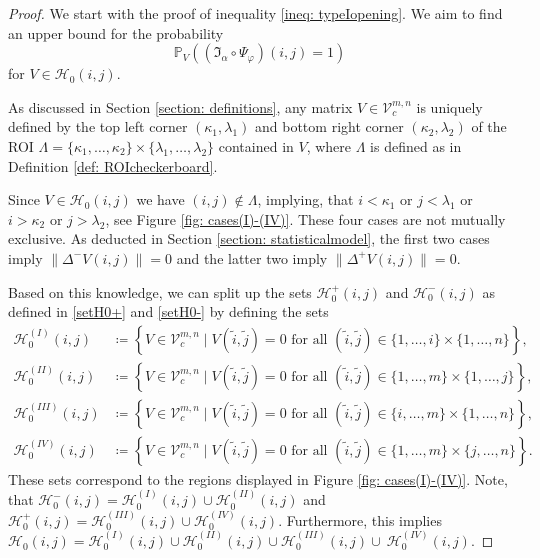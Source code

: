 \documentclass[a4paper,12pt]{article}
\newcommand{\norm}[1]{\lVert#1\rVert}
\theoremstyle{plain}
\theoremstyle{definition}
\numberwithin{equation}{section}
\begin{document}
\begin{proof}
	We start with the proof of inequality \eqref{ineq: typeIopening}. We aim to find an upper bound for the probability
	\begin{equation*}
		\mathbb{P}_V\left( (\mathfrak{I}_\alpha \circ \Psi_\varphi)(i, j) = 1 \right)
	\end{equation*}
	for $V \in \mathcal{H}_0(i, j)$.
	
	As discussed in Section \ref{section: definitions}, any matrix $V \in \mathcal{V}_c^{m, n}$ is uniquely defined by the top left corner $(\kappa_1, \lambda_1)$ and bottom right corner $(\kappa_2, \lambda_2)$ of the ROI $\varLambda = \{ \kappa_1, \dots, \kappa_2 \} \times \{ \lambda_1, \dots, \lambda_2 \}$ contained in $V$, where $\varLambda$ is defined as in Definition \ref{def: ROIcheckerboard}.
	
	Since $V \in \mathcal{H}_0(i, j)$ we have $(i, j) \notin \varLambda$, implying, that $i < \kappa_1$ or $j < \lambda_1$ or $i > \kappa_2$ or $j > \lambda_2$, see Figure \ref{fig: cases(I)-(IV)}. These four cases are not mutually exclusive. As deducted in Section \ref{section: statisticalmodel}, the first two cases imply $\norm{\Delta^- V(i, j)} = 0$ and the latter two imply $\norm{\Delta^+ V(i, j)} = 0$.
	
	Based on this knowledge, we can split up the sets $\mathcal{H}_0^+(i, j)$ and $\mathcal{H}_0^-(i, j)$ as defined in \eqref{setH0+} and \eqref{setH0-} by defining the sets
	\begin{align*}
		\mathcal{H}_0^{(I)}(i, j) &\coloneqq \left\{ V \in \mathcal{V}_c^{m, n} \mid V(\tilde{i}, \tilde{j}) = 0 \textrm{ for all } (\tilde{i}, \tilde{j}) \in \{ 1, \dots, i \} \times \{ 1, \dots, n \} \right\}, \\
		\mathcal{H}_0^{(II)}(i, j) &\coloneqq \left\{ V \in \mathcal{V}_c^{m, n} \mid V(\tilde{i}, \tilde{j}) = 0 \textrm{ for all } (\tilde{i}, \tilde{j}) \in \{ 1, \dots, m \} \times \{ 1, \dots, j \} \right\}, \\
		\mathcal{H}_0^{(III)}(i, j) &\coloneqq \left\{ V \in \mathcal{V}_c^{m, n} \mid V(\tilde{i}, \tilde{j}) = 0 \textrm{ for all } (\tilde{i}, \tilde{j}) \in \{ i, \dots, m \} \times \{ 1, \dots, n \} \right\}, \\
		\mathcal{H}_0^{(IV)}(i, j) &\coloneqq \left\{ V \in \mathcal{V}_c^{m, n} \mid V(\tilde{i}, \tilde{j}) = 0 \textrm{ for all } (\tilde{i}, \tilde{j}) \in \{ 1, \dots, m \} \times \{ j, \dots, n \} \right\}.
	\end{align*}
	These sets correspond to the regions displayed in Figure \ref{fig: cases(I)-(IV)}. Note, that $\mathcal{H}_0^-(i, j) = \mathcal{H}_0^{(I)}(i, j) \cup \mathcal{H}_0^{(II)}(i, j)$ and $\mathcal{H}_0^+(i, j) = \mathcal{H}_0^{(III)}(i, j) \cup \mathcal{H}_0^{(IV)}(i, j)$. Furthermore, this implies $\mathcal{H}_0(i, j) = \mathcal{H}_0^{(I)}(i, j) \cup \mathcal{H}_0^{(II)}(i, j) \cup \mathcal{H}_0^{(III)}(i, j) \cup~\mathcal{H}_0^{(IV)}(i, j)$.
	

\end{proof}
\end{document}
